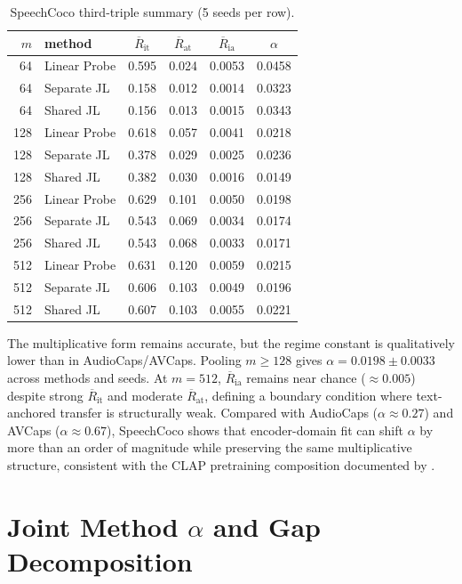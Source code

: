 \documentclass{article}
\newcommand{\avgR}{\overline{R}}
\begin{document}
\begin{table}[ht]
  \caption{SpeechCoco third-triple summary (5 seeds per row).}
  \label{tab:thirdtriple}
  \centering
  \footnotesize
  \begin{tabular}{r l cccc}
    \toprule
    $m$ & method & $\avgR_\mathrm{it}$ & $\avgR_\mathrm{at}$ & $\avgR_\mathrm{ia}$ & $\alpha$ \\
    \midrule
    64  & Linear Probe  & 0.595 & 0.024 & 0.0053 & 0.0458 \\
    64  & Separate JL   & 0.158 & 0.012 & 0.0014 & 0.0323 \\
    64  & Shared JL     & 0.156 & 0.013 & 0.0015 & 0.0343 \\
    128 & Linear Probe  & 0.618 & 0.057 & 0.0041 & 0.0218 \\
    128 & Separate JL   & 0.378 & 0.029 & 0.0025 & 0.0236 \\
    128 & Shared JL     & 0.382 & 0.030 & 0.0016 & 0.0149 \\
    256 & Linear Probe  & 0.629 & 0.101 & 0.0050 & 0.0198 \\
    256 & Separate JL   & 0.543 & 0.069 & 0.0034 & 0.0174 \\
    256 & Shared JL     & 0.543 & 0.068 & 0.0033 & 0.0171 \\
    512 & Linear Probe  & 0.631 & 0.120 & 0.0059 & 0.0215 \\
    512 & Separate JL   & 0.606 & 0.103 & 0.0049 & 0.0196 \\
    512 & Shared JL     & 0.607 & 0.103 & 0.0055 & 0.0221 \\
    \bottomrule
  \end{tabular}
\end{table}

The multiplicative form remains accurate, but the regime constant is qualitatively lower than in AudioCaps/AVCaps.
Pooling $m\geq128$ gives $\alpha=0.0198\pm0.0033$ across methods and seeds.
At $m=512$, $\avgR_\mathrm{ia}$ remains near chance ($\approx0.005$) despite strong $\avgR_\mathrm{it}$ and moderate $\avgR_\mathrm{at}$, defining a boundary condition where text-anchored transfer is structurally weak.
Compared with AudioCaps ($\alpha\approx0.27$) and AVCaps ($\alpha\approx0.67$), SpeechCoco shows that encoder-domain fit can shift $\alpha$ by more than an order of magnitude while preserving the same multiplicative structure, consistent with the CLAP pretraining composition documented by \citet{elizalde2022clap}.

\section{Joint Method \texorpdfstring{$\alpha$}{alpha} and Gap Decomposition}
\label{app:joint_alpha}
\end{document}
